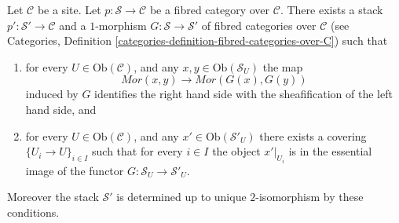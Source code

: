 \begin{lemma}
\label{lemma-stackify}
Let $\mathcal{C}$ be a site.
Let $p : \mathcal{S} \to \mathcal{C}$ be a fibred category over $\mathcal{C}$.
There exists a stack $p' : \mathcal{S}' \to \mathcal{C}$ and a
$1$-morphism $G : \mathcal{S} \to \mathcal{S}'$
of fibred categories over $\mathcal{C}$ (see
Categories, Definition \ref{categories-definition-fibred-categories-over-C})
such that
\begin{enumerate}
\item for every $U \in \text{Ob}(\mathcal{C})$, and any
$x, y \in \text{Ob}(\mathcal{S}_U)$ the map
$$
\mathit{Mor}(x, y) \longrightarrow \mathit{Mor}(G(x), G(y))
$$
induced by $G$ identifies the right hand side with the sheafification
of the left hand side, and
\item for every $U \in \text{Ob}(\mathcal{C})$, and any
$x' \in \text{Ob}(\mathcal{S}'_U)$ there exists a covering
$\{U_i \to U\}_{i \in I}$ such that for every $i \in I$ the
object $x'|_{U_i}$ is in the essential image of the
functor $G : \mathcal{S}_U \to \mathcal{S}'_U$.
\end{enumerate}
Moreover the stack $\mathcal{S}'$ is determined up to unique
$2$-isomorphism by these conditions.
\end{lemma}

